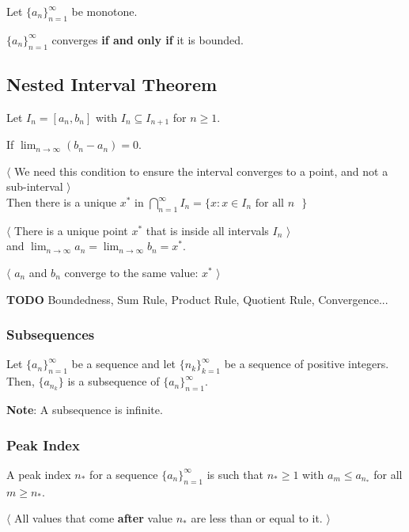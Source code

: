 \documentclass[12pt,letterpaper]{article}
\newcommand{\btw}[1]{
    $\langle$ #1 $\rangle$
}
\newcommand{\TODO}{\color{red}\textbf{TODO}\color{black}}
\begin{document}
\begin{multicols*}{2}
        Let $\{a_n\}_{n = 1}^{\infty}$ be monotone.

        $\{a_n\}_{n = 1}^{\infty}$ converges {\bf if and only if} it is bounded.

        \subsection{Nested Interval Theorem}

        Let $I_n = [a_n, b_n]$ with $I_n \subseteq I_{n + 1}$ for $n \ge 1$.

        If $\lim_{n \to \infty} (b_n - a_n) = 0$.

        \btw{We need this condition to ensure the interval converges to a
        point, and not a sub-interval} \\

        Then there is a unique $x^*$ in $\bigcap_{n = 1}^{\infty} I_n = \{x : x
        \in I_n \text{ for all $n$ } \}$

        \btw{There is a unique point $x^*$ that is inside all intervals $I_n$} \\

        and $\lim_{n \to \infty} a_n = \lim_{n \to \infty} b_n = x^*$.

        \btw{$a_n$ and $b_n$ converge to the same value: $x^*$}

        \TODO{} Boundedness, Sum Rule, Product Rule, Quotient Rule,
        Convergence...

        \subsubsection{Subsequences}

        Let $\{a_n\}_{n = 1}^{\infty}$ be a sequence and let $\{n_k\}_{k =
        1}^{\infty}$ be a sequence of positive integers. Then, $\{a_{n_k}\}$ is
        a subsequence of $\{a_n\}_{n = 1}^{\infty}$.

        {\bf Note}: A subsequence is infinite.

        \subsubsection{Peak Index}

        A peak index $n_*$ for a sequence $\{a_n\}_{n = 1}^{\infty}$ is such
        that $n_* \ge 1$ with $a_m \le a_{n_*}$ for all $m \ge n_*$.

        \btw{All values that come {\bf after} value $n_*$ are less than or equal to
        it.}


\end{multicols*}
\end{document}
